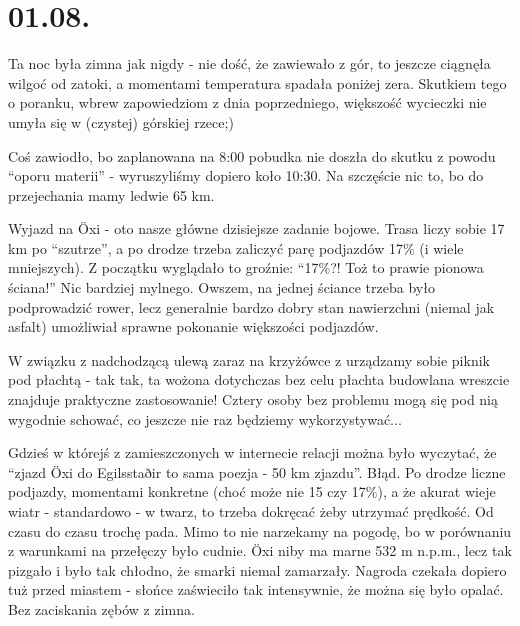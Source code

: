 \chapter{01.08.}

Ta noc była zimna jak nigdy - nie dość, że zawiewało z gór, to jeszcze ciągnęła wilgoć od zatoki, a momentami temperatura spadała poniżej zera. Skutkiem tego o poranku, wbrew zapowiedziom z dnia poprzedniego, większość wycieczki nie umyła się w (czystej) górskiej rzece;)


Coś zawiodło, bo zaplanowana na 8:00 pobudka nie doszła do skutku z powodu “oporu materii” - wyruszyliśmy dopiero koło 10:30. Na szczęście nic to, bo do przejechania mamy ledwie 65 km.

Wyjazd na Öxi - oto nasze główne dzisiejsze zadanie bojowe. Trasa liczy sobie 17 km po “szutrze”, a po drodze trzeba zaliczyć parę podjazdów 17\% (i wiele mniejszych). Z początku wyglądało to groźnie: “17\%?! Toż to prawie pionowa ściana!” Nic bardziej mylnego. Owszem, na jednej ściance trzeba było podprowadzić rower, lecz generalnie bardzo dobry stan nawierzchni (niemal jak asfalt) umożliwiał sprawne pokonanie większości podjazdów.


W związku z nadchodzącą ulewą zaraz na krzyżówce z  urządzamy sobie piknik pod płachtą - tak tak, ta wożona dotychczas bez celu płachta budowlana wreszcie znajduje praktyczne zastosowanie! Cztery osoby bez problemu mogą się pod nią wygodnie schować, co jeszcze nie raz będziemy wykorzystywać...

Gdzieś w którejś z zamieszczonych w internecie relacji można było wyczytać, że “zjazd Öxi do Egilsstaðir to sama poezja - 50 km zjazdu”. Błąd. Po drodze liczne podjazdy, momentami konkretne (choć może nie 15 czy 17\%), a że akurat wieje wiatr - standardowo - w twarz, to trzeba dokręcać żeby utrzymać prędkość. Od czasu do czasu trochę pada. Mimo to nie narzekamy na pogodę, bo w porównaniu z warunkami na przełęczy było cudnie. Öxi niby ma marne 532 m n.p.m., lecz tak pizgało i było tak chłodno, że smarki niemal zamarzały. Nagroda czekała dopiero tuż przed miastem - słońce zaświeciło tak intensywnie, że można się było opalać. Bez zaciskania zębów z zimna.

